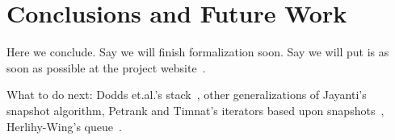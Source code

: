 \section{Conclusions and Future Work}
\label{sec:conclusions}

Here we conclude.  Say we will finish formalization soon. Say we will
put is as soon as possible at the project
website~\cite{FCSL:Project}.


What to do next: Dodds et.al.'s stack~\cite{Dodds-al:POPL15}, other 
generalizations of Jayanti's snapshot algorithm, Petrank and Timnat's
iterators based upon snapshots~\cite{Petrank-Timnat:DISC13}, Herlihy-Wing's
queue~\cite{Herlihy-Wing:TOPLAS90}.
